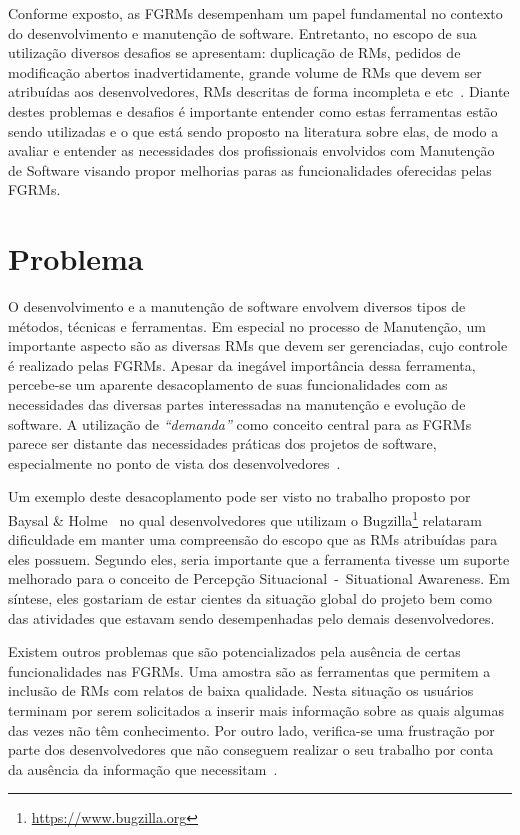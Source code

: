 Conforme exposto, as FGRMs desempenham um papel fundamental no contexto do
desenvolvimento e manutenção de software. Entretanto, no escopo de sua
utilização diversos desafios se apresentam: duplicação de RMs, pedidos de
modificação abertos inadvertidamente, grande volume de RMs que devem ser
atribuídas aos desenvolvedores, RMs descritas de forma incompleta e
etc~\cite{cavalcanti2014challenges}. Diante destes problemas e desafios é
importante entender como estas ferramentas estão sendo utilizadas e o que está
sendo proposto na literatura sobre elas, de modo a avaliar e entender as
necessidades dos profissionais envolvidos com Manutenção de Software visando
propor melhorias paras as funcionalidades oferecidas pelas FGRMs.

\section{Problema}
\label{sec:intro-problema}

O desenvolvimento e a manutenção de software envolvem diversos tipos de métodos,
técnicas e ferramentas. Em especial no processo de Manutenção, um importante
aspecto são as diversas RMs que devem ser gerenciadas, cujo controle é realizado
pelas FGRMs. Apesar da inegável importância dessa ferramenta, percebe-se um
aparente desacoplamento de suas funcionalidades com as necessidades das diversas
partes interessadas na manutenção e evolução de software. A utilização de
\textit{``demanda''} como conceito central para as FGRMs parece ser distante das
necessidades práticas dos projetos de software, especialmente no ponto de vista
dos desenvolvedores~\cite{Baysal:2013:SAP:2486788.2486957}.

Um exemplo deste desacoplamento pode ser visto no trabalho proposto por Baysal
\& Holme~\cite{baysal2012qualitative} no qual desenvolvedores que utilizam o
Bugzilla\footnote{\url{https://www.bugzilla.org}} relataram dificuldade em
manter uma compreensão do escopo que as RMs atribuídas para eles possuem.
Segundo eles, seria importante que a ferramenta tivesse um suporte melhorado
para o conceito de Percepção Situacional~-~Situational Awareness. Em síntese,
eles gostariam de estar cientes da situação global do projeto bem como das
atividades que estavam sendo desempenhadas pelo demais desenvolvedores.

Existem outros problemas que são potencializados pela ausência de certas
funcionalidades nas FGRMs. Uma amostra são as ferramentas que permitem a
inclusão de RMs com relatos de baixa qualidade. Nesta situação os usuários
terminam por serem solicitados a inserir mais informação sobre as quais algumas
das vezes não têm conhecimento. Por outro lado, verifica-se uma frustração por
parte dos desenvolvedores que não conseguem realizar o seu trabalho por conta
da ausência da informação que necessitam~\cite{just2008towards}.

